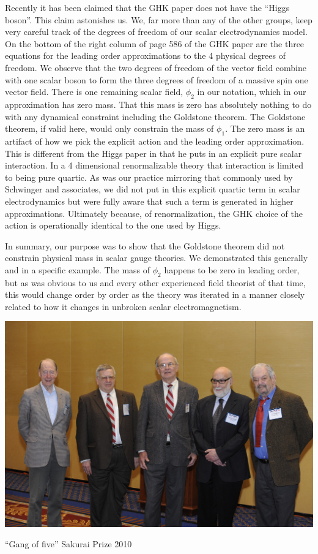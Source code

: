 \documentclass[preprintnumbers,12pt]{revtex4-2}
\begin{document}
Recently it has been claimed that the GHK paper
does not have the ``Higgs boson''. This claim astonishes us. We, far
more than any of the other groups, keep very careful track of the
degrees of freedom of our scalar electrodynamics model. On the bottom
of the right column of page 586 of the GHK paper are the three
equations for the leading order approximations to the 4 physical
degrees of freedom. We observe that the two degrees of freedom of the
vector field combine with one scalar boson to form the three degrees
of freedom of a massive spin one vector field. There is one remaining
scalar field, $\phi_2$ in our notation, which in our approximation has
zero mass. That this mass is zero has absolutely nothing to do with any
dynamical constraint including the Goldstone theorem. The Goldstone
theorem, if valid here, would only constrain the mass of $\phi_1$. The
zero mass is an artifact of how we pick the explicit action and the
leading order approximation. This is different from the Higgs paper in
that he puts in an explicit pure scalar interaction.  In a 4
dimensional renormalizable theory that interaction is limited to being
pure quartic. As was our practice mirroring that commonly used by
Schwinger and associates, we did not put in this explicit quartic term
in scalar electrodynamics but were fully aware that such a term is
generated in higher approximations. Ultimately because, of renormalization, the GHK
choice of the action is operationally identical to the one used by Higgs.

 In summary, our purpose was to show that the Goldstone
theorem did not constrain physical mass in scalar gauge theories. We
demonstrated this generally and in a specific example. The mass of
$\phi_2$ happens to be zero in leading order, but as was obvious to us
and every other experienced field theorist of that time, this would
change order by order as the theory was iterated in a manner closely
related to how it changes in unbroken scalar
electromagnetism. 


\begin{center}
  \includegraphics[scale=0.26]{sp.jpg}

  ``Gang of five'' Sakurai Prize 2010
\end{center}
\end{document}
